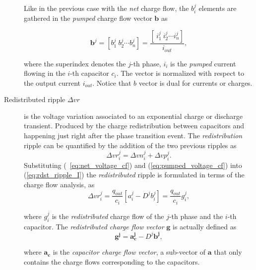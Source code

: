 \begin{description}
      Like in the previous case with the \emph{net} charge flow, the $b_i^j$ elements are gathered in the \emph{pumped} charge flow vector $\mathbf{b}$ as

      \begin{equation}
        \mathbf{b}^j =  \left[ b_1^j~b_2^j \cdots b_n^j \right] = \frac{\left[ ~i_1^j~i_2^j \cdots i_n^j \right]}{i_{out}},
      \label{eq:b_vector}
      \end{equation}

      where the superindex denotes the $j$-th phase, $i_i$ is the \emph{pumped} current flowing in the $i$-th capacitor $c_i$. The vector is normalized with respect to the output current $i_{out}$. Notice that $b$ vector is dual for currents or charges.


  \item[Redistributed ripple $\Delta vr$ ]is the voltage variation associated to an exponential charge or discharge transient. Produced by the charge redistribution between capacitors and happening just right after the phase transition event. The \emph{redistribution} ripple can be quantified by the addition of the two previous ripples as
      \begin{equation}
        \Delta {vr}^j_i  = \Delta {vn}^j_i + \Delta {vp}^j_i .
      \label{eq:rdst_ripple_I}
      \end{equation}
      Substituting (~\ref{eq:net_voltage_cf}) and (\ref{eq:pumped_voltage_cf}) into (\ref{eq:rdst_ripple_I}) the \emph{redistributed} ripple is formulated in terms of the charge flow analysis, as
      \begin{equation}
        \Delta {vr}^j_i  = \frac{q_{out}}{c_i} \left[ a^j_i - D^j b^j_i \right] = \frac{q_{out}}{c_i} g^j_i,
      \label{eq:rdst_ripple_II}
      \end{equation}

      where $g^j_i$ is the \emph{redistributed} charge flow of the $j$-th phase and the $i$-th capacitor. The \emph{redistributed charge flow vector} $\mathbf{g}$ is actually defined as
      \begin{equation}
        \mathbf{g^j}   = \mathbf{a^j_c} - D^j \mathbf{b^j},
      \label{eq:rdst_chrg_flow}
      \end{equation}

      where $\mathbf{a_c}$ is the \emph{capacitor charge flow vector}, a sub-vector of $\mathbf{a}$ that only contains the charge flows corresponding to the capacitors.


\end{description}


